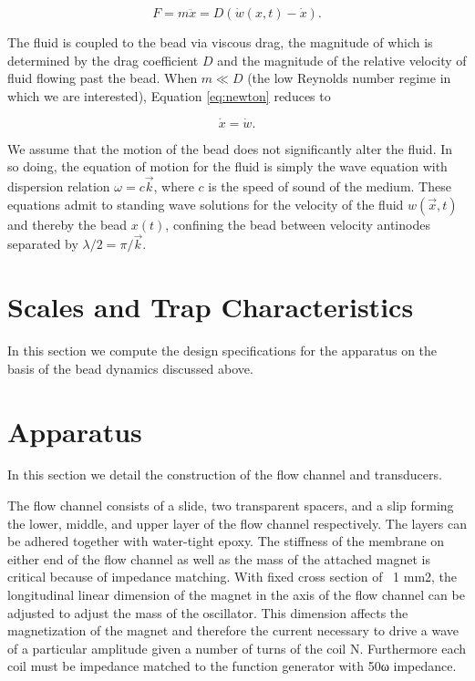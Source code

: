 \begin{equation}
F = m \ddot{x} = D\left(\dot{w}\left(x,t\right)-\dot{x}\right)\label{eq:newton}.
\end{equation}

The fluid is coupled to the bead via viscous drag, the magnitude of which is determined by the drag coefficient $D$ and the magnitude of the relative velocity of fluid flowing past the bead.   When $m \ll D$ (the low Reynolds number regime in which we are interested), Equation \ref{eq:newton} reduces to

\begin{equation}
\dot{x} = \dot{w}.
\end{equation}

We assume that the motion of the bead does not significantly alter the fluid.  In so doing, the equation of motion for the fluid is simply the wave equation with dispersion relation $\omega = c \vec{k}$, where $c$ is the speed of sound of the medium.  These equations admit to standing wave solutions for the velocity of the fluid $w\left(\vec{x},t\right)$ and thereby the bead $x\left(t\right)$, confining the bead between velocity antinodes separated by $\lambda/2 = \pi/\vec{k}$.

\section{Scales and Trap Characteristics}

In this section we compute the design specifications for the apparatus on the basis of the bead dynamics discussed above.

\section{Apparatus}

In this section we detail the construction of the flow channel and transducers.

The flow channel consists of a slide, two transparent spacers, and a slip forming the lower, middle, and upper layer of the flow channel respectively. The layers can be adhered together with water-tight epoxy. The stiffness of the membrane on either end of the flow channel as well as the mass of the attached magnet is critical because of impedance matching. With fixed cross section of ~1 mm2, the longitudinal linear dimension of the magnet in the axis of the flow channel can be adjusted to adjust the mass of the oscillator. This dimension affects the magnetization of the magnet and therefore the current necessary to drive a wave of a particular amplitude given a number of turns of the coil N. Furthermore each coil must be impedance matched to the function generator with 50ω impedance.

